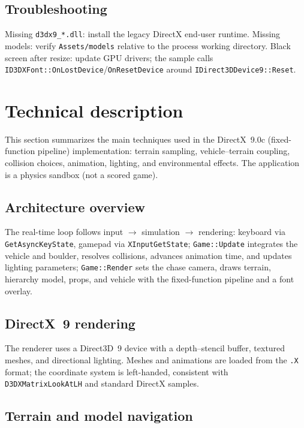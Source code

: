 \documentclass[11pt,a4paper]{article}
\begin{document}
\subsection{Troubleshooting}
Missing \texttt{d3dx9\_*.dll}: install the legacy DirectX end-user runtime. Missing models: verify \texttt{Assets/models} relative to the process working directory. Black screen after resize: update GPU drivers; the sample calls \texttt{ID3DXFont::OnLostDevice}/\texttt{OnResetDevice} around \texttt{IDirect3DDevice9::Reset}.

\section{Technical description}
\label{sec:technical}

This section summarizes the main techniques used in the DirectX~9.0c (fixed-function pipeline) implementation: terrain sampling, vehicle--terrain coupling, collision choices, animation, lighting, and environmental effects. The application is a physics sandbox (not a scored game).

\subsection{Architecture overview}
The real-time loop follows input $\rightarrow$ simulation $\rightarrow$ rendering: keyboard via \texttt{GetAsyncKeyState}, gamepad via \texttt{XInputGetState}; \texttt{Game::Update} integrates the vehicle and boulder, resolves collisions, advances animation time, and updates lighting parameters; \texttt{Game::Render} sets the chase camera, draws terrain, hierarchy model, props, and vehicle with the fixed-function pipeline and a font overlay.

\subsection{DirectX~9 rendering}
The renderer uses a Direct3D~9 device with a depth--stencil buffer, textured meshes, and directional lighting. Meshes and animations are loaded from the \texttt{.X} format; the coordinate system is left-handed, consistent with \texttt{D3DXMatrixLookAtLH} and standard DirectX samples.

\subsection{Terrain and model navigation}
\label{sec:techniques-terrain}
\end{document}
